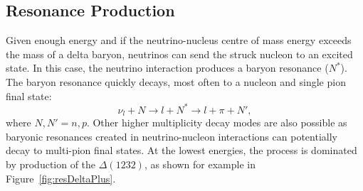 \subsection{Resonance Production}
\label{sec:res}

Given enough energy and if the neutrino-nucleus centre of mass energy exceeds the mass of a delta baryon, neutrinos can send the struck nucleon to an excited state. In this case, the neutrino interaction produces a baryon resonance ($N^*$). The baryon resonance quickly decays, most often to a nucleon and single pion final state:
\begin{equation}
\nu_l + N \rightarrow l + N^* \rightarrow l + \pi + N',
\end{equation}
where $N, N' = n, p$. Other higher multiplicity decay modes are also possible as baryonic resonances created in neutrino-nucleon interactions can potentially decay to multi-pion final states. At the lowest energies, the process is dominated by production of the $\Delta(1232)$, as shown for example in Figure~\ref{fig:resDeltaPlus}.

